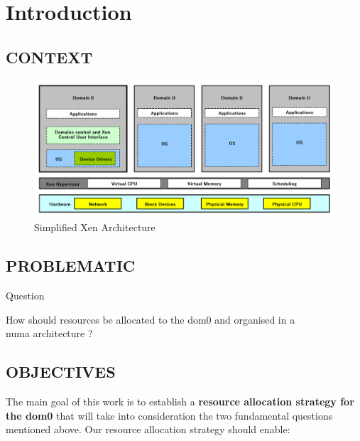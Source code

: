 %
%
\let\textcircled=\pgftextcircled
\chapter*{Introduction}
\label{chap:intro}
\section*{CONTEXT}
\lipsum[2] 

\par \lipsum[2]

\begin{figure}[!h]
	\centering
    \includegraphics[width=\linewidth]{fig01/xen_simple.pdf}
    \caption{Simplified Xen Architecture}
    \label{fig:arch_simple_xen}
\end{figure}

\section*{PROBLEMATIC}

\lipsum[2]

\begin{bidentidad}{Question}
\begin{itemize}
    \centering How should resources be allocated to the dom0 and organised in a \\ \acrshort{numa} architecture ? 
\end{itemize}
\end{bidentidad}

\section*{OBJECTIVES}
The main goal of this work is to establish a \textbf{resource allocation strategy for the dom0} that will take into consideration the two fundamental questions mentioned above. Our resource allocation strategy should enable: 

